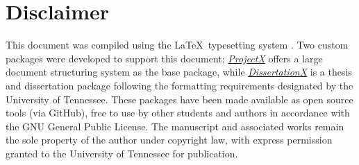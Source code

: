 \documentclass[../../main.tex]{subfiles}%
\begin{document}
%
    \section{Disclaimer}%
    \label{sec:chapter-1:disclaimer}%
    This document was compiled using the \LaTeX\ typesetting system \cite{latex,website:LaTeX}.
    Two custom packages were developed to support this document; \href{https://github.com/ehhx85/ProjectX}{\textit{ProjectX}} offers a large document structuring system as the base package, while \href{https://github.com/ehhx85/DissertationX}{\textit{DissertationX}} is a thesis and dissertation package following the formatting requirements designated by the University of Tennessee.
    These packages have been made available as open source tools (via GitHub), free to use by other students and authors in accordance with the GNU General Public License.
    The manuscript and associated works remain the sole property of the author under copyright law, with express permission granted to the University of Tennessee for publication. 
\end{document}
